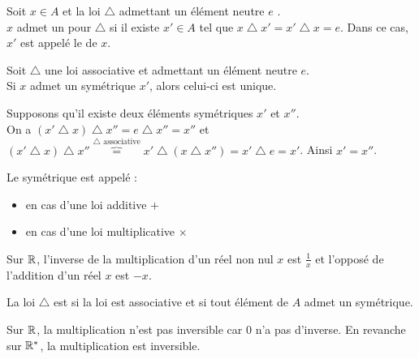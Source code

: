 \documentclass{book}
\begin{document}
\begin{Definition}
Soit $ x\in A$ et la loi $\bigtriangleup$  admettant  un élément neutre $e$ .\\
$x$ admet un  pour $\bigtriangleup$ si il existe $x'\in A$ tel que $x \bigtriangleup x' = x' \bigtriangleup x = e$. Dans ce cas, $x'$ est appelé le  de $x$.
\end{Definition}
\begin{Proposition}
Soit $\bigtriangleup$ une loi associative et admettant  un élément neutre $e$.\\
Si $x$ admet un symétrique $x'$, alors celui-ci est unique.
\end{Proposition}
\begin{Demonstration}
Supposons qu'il existe deux éléments symétriques $x'$ et $x''$.\\
On a $(x' \bigtriangleup x)\bigtriangleup x''=e\bigtriangleup x''=x''$ et $(x' \bigtriangleup x)\bigtriangleup x''\overbrace{=}^{\bigtriangleup \text{ associative}} x'\bigtriangleup(x\bigtriangleup x'')=x'\bigtriangleup e=x'$.  Ainsi $x'=x''$.
\end{Demonstration}
\begin{Vocabulaire}
Le symétrique est appelé :
\begin{itemize}
\item {} en cas d'une loi additive $+$
\item {} en cas d'une loi multiplicative $\times$
\end{itemize}
\end{Vocabulaire}

\begin{Exemple}
Sur $\mathbb{R}$,  l'inverse de la multiplication d'un réel non nul $x$ est $\frac{1}{x}$ et l'opposé de l'addition d'un réel $x$ est $-x$.
\end{Exemple}

\begin{Definition}
La loi $\bigtriangleup$ est   si la loi est associative et si tout élément de $A$ admet un symétrique.
\end{Definition}

\begin{Exemple}
Sur $\mathbb{R}$, la multiplication n'est pas inversible car $0$ n'a pas d'inverse. En revanche sur $\mathbb{R}^*$, la multiplication est inversible.
\end{Exemple}
\end{document}
